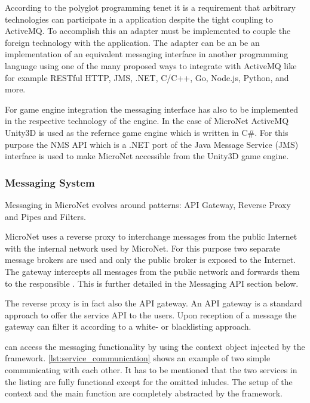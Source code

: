According to the polyglot programming tenet it is a requirement that arbitrary
technologies can participate in a \ms{} application despite the tight coupling
to ActiveMQ. To accomplish this an adapter must be implemented to couple the
foreign technology with the application. The adapter can be an be an
implementation of an equivalent messaging interface in another programming
language using one of the many proposed ways to integrate with ActiveMQ like for
example RESTful HTTP, JMS, .NET, C/C++, Go, Node.js, Python, and more.

For game engine integration the messaging interface has also to be implemented
in the respective technology of the engine. In the case of MicroNet ActiveMQ
Unity3D is used as the refernce game engine which is written in C\#. For this
purpose the NMS API which is a .NET port of the Java Message Service (JMS)
interface is used to make MicroNet accessible from the Unity3D game engine.

\subsubsection{Messaging System}

Messaging in MicroNet evolves around patterns: API Gateway, Reverse Proxy and
Pipes and Filters.

MicroNet uses a reverse proxy to interchange messages from the public Internet
with the internal network used by MicroNet. For this purpose two separate
message brokers are used and only the public broker is exposed to the Internet.
The gateway intercepts all messages from the public network and forwards them to
the responsible \ms{}. This is further detailed in the Messaging API section
below.

The reverse proxy is in fact also the API gateway. An API gateway is a standard
approach to offer the service API to the users. Upon reception of a message the
gateway can filter it according to a white- or blacklisting approach.

\mss{} can access the messaging functionality by using the context object
injected by the framework. \autoref{lst:service_communication} shows an example
of two simple \mss{} communicating with each other. It has to be mentioned that
the two services in the listing are fully functional except for the omitted
inludes. The setup of the context and the \ms{} main function are completely
abstracted by the framework.

